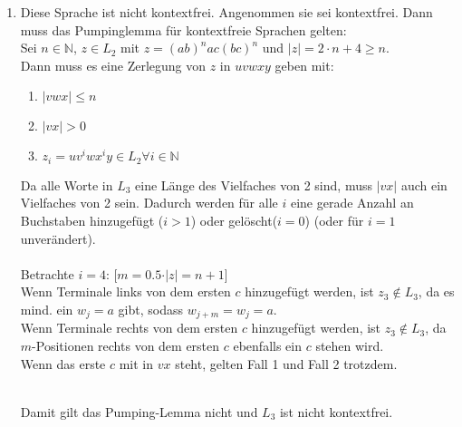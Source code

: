 \documentclass[11pt]{article}
\begin{document}
\begin{enumerate}[label=\arabic*)]
\item
Diese Sprache ist nicht kontextfrei.
Angenommen sie sei kontextfrei. Dann muss das Pumpinglemma für kontextfreie Sprachen gelten:
\\Sei $n\in\mathbb{N}$, $z\in L_2$ mit $z=(ab)^nac(bc)^n$ und $\vert z \vert = 2\cdot n + 4 \geq n$.
\\Dann muss es eine Zerlegung von $z$ in $uvwxy$ geben mit:
\begin{enumerate}[label=(\arabic*)]
\item $\vert vwx \vert \leq n$
\item $\vert vx \vert > 0$
\item $z_i=uv^iwx^iy\in L_2 \forall i\in\mathbb{N}$
\end{enumerate}
Da alle Worte in $L_3$ eine Länge des Vielfaches von 2 sind, muss $\vert vx \vert$ auch ein Vielfaches von 2 sein. Dadurch werden für alle $i$ eine gerade Anzahl an Buchstaben hinzugefügt ($i>1$) oder gelöscht($i=0$) (oder für $i=1$ unverändert).
\\\\Betrachte $i=4$: [$m=0.5\cdot\vert z \vert = n+1$]
\\Wenn Terminale links von dem ersten $c$ hinzugefügt werden, ist $z_3 \not\in L_3$, da es mind. ein $w_j=a$ gibt, sodass $w_{j+m}=w_j=a$.
\\Wenn Terminale rechts von dem ersten $c$ hinzugefügt werden, ist $z_3 \not\in L_3$, da $m$-Positionen rechts von dem ersten $c$ ebenfalls ein $c$ stehen wird.
\\Wenn das erste $c$ mit in $vx$ steht, gelten Fall 1 und Fall 2 trotzdem.

\\Damit gilt das Pumping-Lemma nicht und $L_3$ ist nicht kontextfrei.

\end{enumerate}
\end{document}
